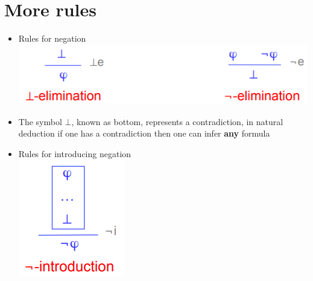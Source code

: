 \documentclass{article}[18pt]
\begin{document}
\section{More rules}
\begin{itemize}
	\item Rules for negation\\
	\includegraphics[scale=0.7]{negation_rules.png}
	\item The symbol $\bot$, known as bottom, represents a contradiction, in natural deduction if one has a contradiction then one can infer \textbf{any} formula
	\item Rules for introducing negation\\
	\includegraphics[scale=0.7]{introduce_negation.png}
\end{itemize}
\end{document}
